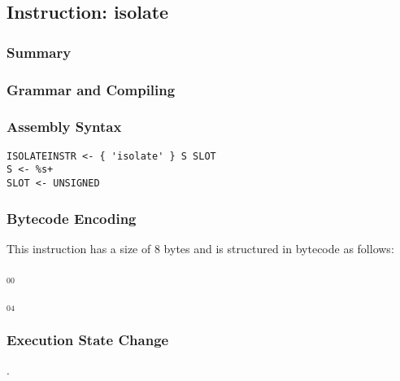 \subsection{Instruction: isolate}

\subsubsection{Summary}


\subsubsection{Grammar and Compiling}


\subsubsection{Assembly Syntax}

\begin{myquote}
\begin{verbatim}
ISOLATEINSTR <- { 'isolate' } S SLOT
S <- %s+
SLOT <- UNSIGNED
\end{verbatim}
\end{myquote}

\subsubsection{Bytecode Encoding}

This instruction has a size of 8 bytes and is structured in bytecode as follows:

$_{00}$\ 



$_{04}$\ 


\subsubsection{Execution State Change}

.


